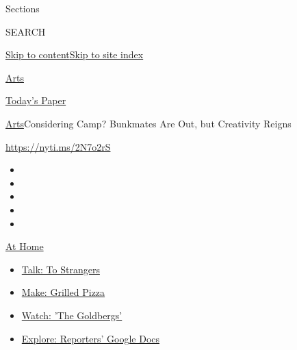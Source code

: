 Sections

SEARCH

\protect\hyperlink{site-content}{Skip to
content}\protect\hyperlink{site-index}{Skip to site index}

\href{https://www.nytimes3xbfgragh.onion/section/arts}{Arts}

\href{https://myaccount.nytimes3xbfgragh.onion/auth/login?response_type=cookie\&client_id=vi}{}

\href{https://www.nytimes3xbfgragh.onion/section/todayspaper}{Today's
Paper}

\href{/section/arts}{Arts}\textbar{}Considering Camp? Bunkmates Are Out,
but Creativity Reigns

\href{https://nyti.ms/2N7o2rS}{https://nyti.ms/2N7o2rS}

\begin{itemize}
\item
\item
\item
\item
\item
\end{itemize}

\href{https://www.nytimes3xbfgragh.onion/spotlight/at-home?action=click\&pgtype=Article\&state=default\&region=TOP_BANNER\&context=at_home_menu}{At
Home}

\begin{itemize}
\tightlist
\item
  \href{https://www.nytimes3xbfgragh.onion/2020/08/03/well/family/the-benefits-of-talking-to-strangers.html?action=click\&pgtype=Article\&state=default\&region=TOP_BANNER\&context=at_home_menu}{Talk:
  To Strangers}
\item
  \href{https://www.nytimes3xbfgragh.onion/2020/08/01/at-home/coronavirus-make-pizza-on-a-grill.html?action=click\&pgtype=Article\&state=default\&region=TOP_BANNER\&context=at_home_menu}{Make:
  Grilled Pizza}
\item
  \href{https://www.nytimes3xbfgragh.onion/2020/07/31/arts/television/goldbergs-abc-stream.html?action=click\&pgtype=Article\&state=default\&region=TOP_BANNER\&context=at_home_menu}{Watch:
  'The Goldbergs'}
\item
  \href{https://www.nytimes3xbfgragh.onion/interactive/2020/at-home/even-more-reporters-editors-diaries-lists-recommendations.html?action=click\&pgtype=Article\&state=default\&region=TOP_BANNER\&context=at_home_menu}{Explore:
  Reporters' Google Docs}
\end{itemize}

